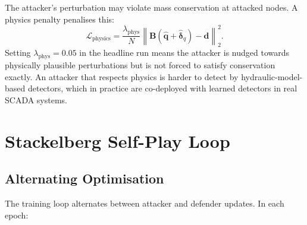 The attacker's perturbation may violate mass conservation at attacked
nodes. A physics penalty penalises this:
\begin{equation}
  \mathcal{L}_\text{physics} = \frac{\lambda_\text{phys}}{N}
    \left\|\mathbf{B}(\hat{\mathbf{q}} + \hat{\boldsymbol{\delta}}_q)
    - \mathbf{d}\right\|_2^2.
\end{equation}
Setting $\lambda_\text{phys} = 0.05$ in the headline run means the
attacker is nudged towards physically plausible perturbations but
is not forced to satisfy conservation exactly. An attacker that
respects physics is harder to detect by hydraulic-model-based
detectors, which in practice are co-deployed with learned detectors
in real SCADA systems.

\section{Stackelberg Self-Play Loop}
\label{sec:stackelberg_loop}

\subsection{Alternating Optimisation}

The training loop alternates between attacker and defender updates.
In each epoch:

\begin{algorithm}[htbp]
  \DontPrintSemicolon
  \caption{Stackelberg Self-Play Training Loop}
  \label{alg:selfplay}
\end{algorithm}

